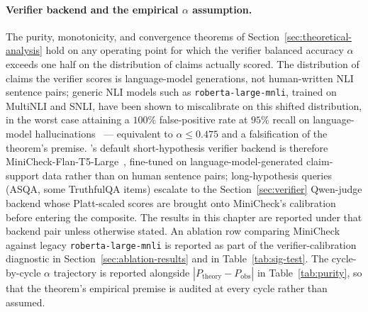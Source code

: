 \paragraph{Verifier backend and the empirical $\alpha$ assumption.}
The purity, monotonicity, and convergence theorems of Section~\ref{sec:theoretical-analysis} hold on any operating point for which the verifier balanced accuracy $\alpha$ exceeds one half on the distribution of claims actually scored. The distribution of claims the \caem{} verifier scores is language-model generations, not human-written NLI sentence pairs; generic NLI models such as \texttt{roberta-large-mnli}, trained on MultiNLI and SNLI, have been shown to miscalibrate on this shifted distribution, in the worst case attaining a $100\%$ false-positive rate at $95\%$ recall on language-model hallucinations~\cite{semanticillusion2025} --- equivalent to $\alpha \leq 0.475$ and a falsification of the theorem's premise. \caem{}'s default short-hypothesis verifier backend is therefore MiniCheck-Flan-T5-Large~\cite{tang2024minicheck}, fine-tuned on language-model-generated claim-support data rather than on human sentence pairs; long-hypothesis queries (ASQA, some TruthfulQA items) escalate to the Section~\ref{sec:verifier} Qwen-judge backend whose Platt-scaled scores are brought onto MiniCheck's calibration before entering the composite. The results in this chapter are reported under that backend pair unless otherwise stated. An ablation row comparing MiniCheck against legacy \texttt{roberta-large-mnli} is reported as part of the verifier-calibration diagnostic in Section~\ref{sec:ablation-results} and in Table~\ref{tab:sig-test}. The cycle-by-cycle $\alpha$ trajectory is reported alongside $|P_{\text{theory}} - P_{\text{obs}}|$ in Table~\ref{tab:purity}, so that the theorem's empirical premise is audited at every cycle rather than assumed.

